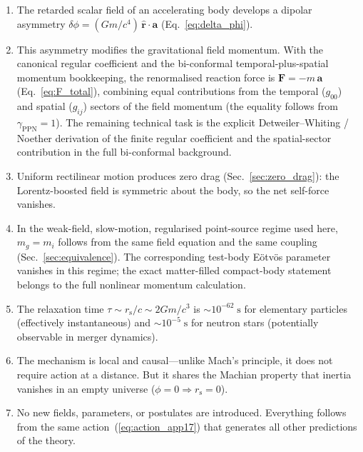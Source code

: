 \documentclass[11pt]{article}
\newcommand{\rs}{r_{\mathrm{s}}}
\begin{document}
\begin{enumerate}
\item The retarded scalar field of an accelerating body
  develops a dipolar asymmetry
  $\delta\phi = (Gm/c^4)\,\hat{\mathbf{r}}\cdot
  \mathbf{a}$ (Eq.~\ref{eq:delta_phi}).

\item This asymmetry modifies the gravitational field
  momentum.  With the canonical regular coefficient and
  the bi-conformal temporal-plus-spatial momentum
  bookkeeping, the renormalised reaction force is
  $\mathbf{F} = -m\,\mathbf{a}$ (Eq.~\ref{eq:F_total}),
  combining equal contributions from the temporal ($g_{00}$)
  and spatial ($g_{ij}$) sectors of the field momentum
  (the equality follows from $\gamma_{\mathrm{PPN}}=1$).
  The remaining technical task is the explicit
  Detweiler--Whiting / Noether derivation of the finite
  regular coefficient and the spatial-sector contribution
  in the full bi-conformal background.

\item Uniform rectilinear motion produces zero drag
  (Sec.~\ref{sec:zero_drag}): the Lorentz-boosted field
  is symmetric about the body, so the net self-force
  vanishes.

\item In the weak-field, slow-motion, regularised
  point-source regime used here, $m_g=m_i$ follows from
  the same field equation and the same coupling
  (Sec.~\ref{sec:equivalence}).  The corresponding
  test-body E\"otv\"os parameter vanishes in this regime;
  the exact matter-filled compact-body statement belongs
  to the full nonlinear momentum calculation.

\item The relaxation time
  $\tau \sim \rs/c \sim 2Gm/c^3$ is
  $\sim 10^{-62}\;\mathrm{s}$ for elementary particles
  (effectively instantaneous) and
  $\sim 10^{-5}\;\mathrm{s}$ for neutron stars
  (potentially observable in merger dynamics).

\item The mechanism is local and causal---unlike Mach's
  principle, it does not require action at a distance.
  But it shares the Machian property that inertia
  vanishes in an empty universe ($\phi = 0 \Rightarrow
  \rs = 0$).

\item No new fields, parameters, or postulates are
  introduced.  Everything follows from the same
  action~(\ref{eq:action_app17}) that generates all other
  predictions of the theory.


\end{enumerate}
\end{document}
